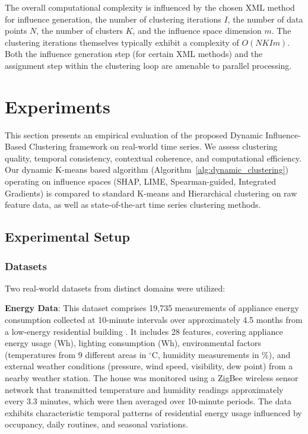 \documentclass[final,authoryear,3p,times,review,sort&compress]{elsarticle}
\begin{document}
The overall computational complexity is influenced by the chosen XML method for influence generation, the number of clustering iterations $I$, the number of data points $N$, the number of clusters $K$, and the influence space dimension $m$. The clustering iterations themselves typically exhibit a complexity of $O(N K I m)$. Both the influence generation step (for certain XML methods) and the assignment step within the clustering loop are amenable to parallel processing.

\section{Experiments}
\label{sec:exp}
This section presents an empirical evaluation of the proposed Dynamic Influence-Based Clustering framework on real-world time series. We assess clustering quality, temporal consistency, contextual coherence, and computational efficiency. Our dynamic K-means based algorithm (Algorithm~\ref{alg:dynamic_clustering}) operating on influence spaces (SHAP, LIME, Spearman-guided, Integrated Gradients) is compared to standard K-means and Hierarchical clustering on raw feature data, as well as state-of-the-art time series clustering methods.

\subsection{Experimental Setup}
\label{sec:exp_setup}

\subsubsection{Datasets}
Two real-world datasets from distinct domains were utilized:

\textbf{Energy Data}: This dataset comprises 19,735 measurements of appliance energy consumption collected at 10-minute intervals over approximately 4.5 months from a low-energy residential building \citep{data:energy_uci}. It includes 28 features, covering appliance energy usage (Wh), lighting consumption (Wh), environmental factors (temperatures from 9 different areas in $^\circ$C, humidity measurements in \%), and external weather conditions (pressure, wind speed, visibility, dew point) from a nearby weather station. The house was monitored using a ZigBee wireless sensor network that transmitted temperature and humidity readings approximately every 3.3 minutes, which were then averaged over 10-minute periods. The data exhibits characteristic temporal patterns of residential energy usage influenced by occupancy, daily routines, and seasonal variations.
\end{document}

